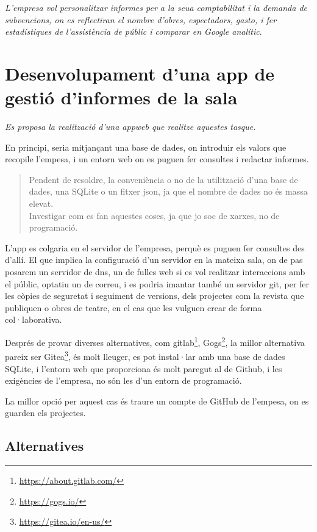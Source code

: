 \documentclass[
  10pt,
]{krantz}
\DeclareRobustCommand{\href}[2]{#2\footnote{\url{#1}}}
\begin{document}
\emph{L'empresa vol personalitzar informes per a la seua comptabilitat i la demanda de subvencions, on es reflectiran el nombre d'obres, espectadors, gasto, i fer estadístiques de l'assistència de públic i comparar en Google analític}.

\hypertarget{desenvolupament-duna-app-de-gestiuxf3-dinformes-de-la-sala}{%
\section{Desenvolupament d'una app de gestió d'informes de la sala}\label{desenvolupament-duna-app-de-gestiuxf3-dinformes-de-la-sala}}

\emph{Es proposa la realització d'una appweb que realitze aquestes tasque.}

En principi, seria mitjançant una base de dades, on introduir els valors que recopile l'empesa, i un entorn web on es puguen fer consultes i redactar informes.

\begin{quote}
Pendent de resoldre, la conveniència o no de la utilització d'una base de dades, una SQLite o un fitxer json, ja que el nombre de dades no és massa elevat.\\
Investigar com es fan aquestes coses, ja que jo soc de xarxes, no de programació.
\end{quote}

L'app es colgaria en el servidor de l'empresa, perquè es puguen fer consultes des d'allí. El que implica la configuració d'un servidor en la mateixa sala, on de pas posarem un servidor de dns, un de fulles web si es vol realitzar interaccions amb el públic, optatiu un de correu, i es podria imantar també un servidor git, per fer les còpies de seguretat i seguiment de versions, dels projectes com la revista que publiquen o obres de teatre, en el cas que les vulguen crear de forma col·laborativa.

Després de provar diverses alternatives, com \href{https://about.gitlab.com/}{gitlab}, \href{https://gogs.io/}{Gogs}, la millor alternativa pareix ser \href{https://gitea.io/en-us/}{Gitea}, és molt lleuger, es pot instal·lar amb una base de dades SQLite, i l'entorn web que proporciona és molt paregut al de Github, i les exigències de l'empresa, no són les d'un entorn de programació.

La millor opció per aquest cas és traure un compte de GitHub de l'empesa, on es guarden els projectes.

\hypertarget{alternatives}{%
\subsection{Alternatives}\label{alternatives}}
\end{document}
